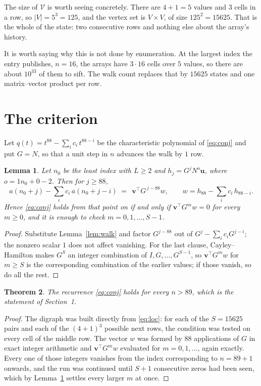 \documentclass[11pt,a4paper]{article}
\theoremstyle{plain}
\newtheorem{theorem}{Theorem}
\newtheorem{lemma}[theorem]{Lemma}
\theoremstyle{definition}
\begin{document}
The size of $\mathcal V$ is worth seeing concretely. There are $4+1=5$ values
and $3$ cells in a row, so $|V|=5^{3}=125$, and the vertex set is
$V\times V$, of size $125^2=15625$. That is the whole of the state: two consecutive
rows and nothing else about the array's history.

It is worth saying why this is not done by enumeration. At the largest index the entry
publishes, $n=16$, the arrays have $3\cdot16$ cells over
$5$ values, so there are about $10^{33}$ of them to sift. The
walk count replaces that by $15625$ states and one matrix--vector product per row.
\section{The criterion}

Let $q(t)=t^{88}-\sum_i c_i\,t^{88-i}$ be the characteristic polynomial of
\eqref{eq:conj} and put $G=N$, so that a unit step in $n$ advances the walk by
$1$ row.

\begin{lemma}\label{lem:crit}
Let $n_0$ be the least index with $L\ge2$ and $h_j=G^{j}N^{o}\mathbf{u}$, where
$o=1n_0+0-2$. Then for $j\ge88$,
\[
a(n_0+j)-\sum_i c_i\,a(n_0+j-i)\;=\;\,\mathbf{v}^{\!\top}G^{\,j-88}w,
\qquad w=h_{88}-\sum_i c_i\,h_{88-i} .
\]
Hence \eqref{eq:conj} holds from that point on if and only if
$\mathbf{v}^{\!\top}G^{m}w=0$ for every $m\ge0$, and it is enough to check
$m=0,1,\dots,S-1$.
\end{lemma}

\begin{proof}
Substitute Lemma~\ref{lem:walk} and factor $G^{j-88}$ out of
$G^{j}-\sum_ic_iG^{j-i}$; the nonzero scalar $1$ does not affect
vanishing. For the last clause, Cayley--Hamilton makes $G^{S}$ an integer combination of
$I,G,\dots,G^{S-1}$, so $\mathbf{v}^{\!\top}G^{m}w$ for $m\ge S$ is the corresponding
combination of the earlier values; if those vanish, so do all the rest.
\end{proof}

\begin{theorem}
The recurrence \eqref{eq:conj} holds for every $n>89$, which is the statement of
Section~1.
\end{theorem}

\begin{proof}
The digraph was built directly from \eqref{eq:loc}: for each of the $S=15625$ pairs and each
of the $(4+1)^{3}$ possible next rows, the condition was tested on every cell of
the middle row. The vector $w$ was formed by $88$ applications of $G$ in exact integer
arithmetic and $\mathbf{v}^{\!\top}G^{m}w$ evaluated for $m=0,1,\dots$, again exactly.
Every one of those integers vanishes from the index corresponding to $n=89+1$ onwards,
and the run was continued until $S+1$ consecutive zeros had been seen, which by
Lemma~\ref{lem:crit} settles every larger $m$ at once.
\end{proof}
\end{document}
